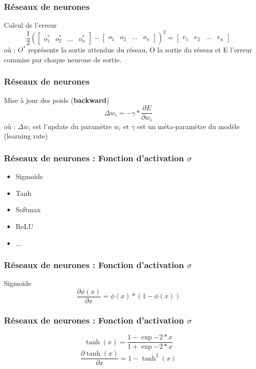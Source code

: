 \documentclass{formation}
\begin{document}
\begin{frame}
  \frametitle{Réseaux de neurones}
  Calcul de l'erreur
  \[
  \frac{1}{2}\left (
  \begin{bmatrix}
    o_{1}^* & o_{2}^* & \dots & o_{n}^*
  \end{bmatrix}
  -
  \begin{bmatrix}
    o_{1} & o_{2} & \dots & o_{n}
  \end{bmatrix}
  \right )^2
  =
  \begin{bmatrix}
    e_{1} & e_{2} & \dots & e_{n}
  \end{bmatrix}
  \]
  \newline
  où :
  \newline
  $O^*$ représente la sortie attendue du réseau,
  \newline
  O la sortie du réseau et
  \newline
  E l'erreur commise par chaque neurone de sortie.
  \newline
\end{frame}

\begin{frame}
  \frametitle{Réseaux de neurones}
  Mise à jour des poids (\textbf{backward})
  \[
  \Delta w_i = -\gamma * \frac{\partial{E}}{\partial{w_i}}
  \]
  \newline
  où :
  \newline
  $\Delta w_i$ est l'update du paramètre $w_i$ et
  \newline
  $\gamma$ est un méta-paramètre du modèle (learning rate)
\end{frame}

\begin{frame}
  \frametitle{Réseaux de neurones : Fonction d'activation $\sigma$}
  \begin{itemize}
  \item Sigmoïde
  \item Tanh
  \item Softmax
  \item ReLU
  \item ...
  \end{itemize}
\end{frame}

\begin{frame}
  \frametitle{Réseaux de neurones : Fonction d'activation $\sigma$}
  Sigmoïde
  \[
  \frac{\partial{\phi(x)}}{\partial{x}}=\phi(x)*(1-\phi(x))
  \]
\end{frame}

\begin{frame}
  \frametitle{Réseaux de neurones : Fonction d'activation $\sigma$}
  \[
  \tanh(x)=\frac{1-\exp{-2*x}}{1+\exp{-2*x}}
  \]
  \[
  \frac{\partial{\tanh(x)}}{\partial{x}}=1-\tanh^2(x)
  \]
\end{frame}
\end{document}
